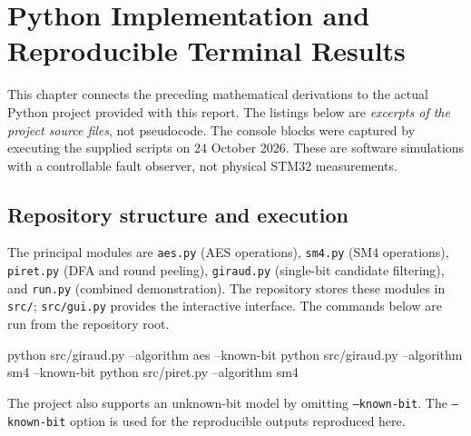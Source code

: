 \chapter{Python Implementation and Reproducible Terminal Results}
\label{chap:implementation}
This chapter connects the preceding mathematical derivations to the actual Python project provided with this report. The listings below are \emph{excerpts of the project source files}, not pseudocode. The console blocks were captured by executing the supplied scripts on 24 October 2026. These are software simulations with a controllable fault observer, not physical STM32 measurements.

\section{Repository structure and execution}
The principal modules are \texttt{aes.py} (AES operations), \texttt{sm4.py} (SM4 operations), \texttt{piret.py} (DFA and round peeling), \texttt{giraud.py} (single-bit candidate filtering), and \texttt{run.py} (combined demonstration). The repository stores these modules in \texttt{src/}; \texttt{src/gui.py} provides the interactive interface. The commands below are run from the repository root.
\begin{lightcode}
python src/giraud.py --algorithm aes --known-bit
python src/giraud.py --algorithm sm4 --known-bit
python src/piret.py --algorithm sm4
\end{lightcode}
The project also supports an unknown-bit model by omitting \texttt{--known-bit}. The \texttt{--known-bit} option is used for the reproducible outputs reproduced here.

